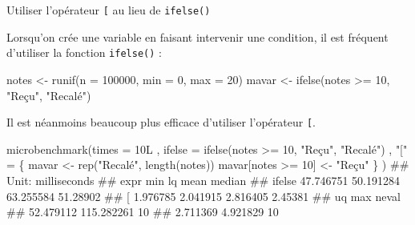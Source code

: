 \documentclass[12pt,ignorenonframetext,]{beamer}
\newenvironment{Shaded}{}{}
\newcommand{\DataTypeTok}[1]{#1}
\newcommand{\DecValTok}[1]{#1}
\newcommand{\KeywordTok}[1]{\textcolor[rgb]{0.00,0.00,1.00}{#1}}
\newcommand{\NormalTok}[1]{#1}
\newcommand{\OperatorTok}[1]{#1}
\newcommand{\StringTok}[1]{\textcolor[rgb]{0.00,0.50,0.50}{#1}}
\renewenvironment{Shaded}{\begin{snugshade}}{\end{snugshade}}
\begin{document}
\begin{frame}[fragile]{Utiliser l’opérateur \texttt{{[}} au lieu de
\texttt{ifelse()}}
\protect\hypertarget{utiliser-loperateur-au-lieu-de-ifelse}{}

\small

Lorsqu’on crée une variable en faisant intervenir une condition, il est
fréquent d’utiliser la fonction \texttt{ifelse()} :

\footnotesize

\begin{Shaded}
\begin{Highlighting}[]
\NormalTok{notes <-}\StringTok{ }\KeywordTok{runif}\NormalTok{(}\DataTypeTok{n =} \DecValTok{100000}\NormalTok{, }\DataTypeTok{min =} \DecValTok{0}\NormalTok{, }\DataTypeTok{max =} \DecValTok{20}\NormalTok{)}
\NormalTok{mavar <-}\StringTok{ }\KeywordTok{ifelse}\NormalTok{(notes }\OperatorTok{>=}\StringTok{ }\DecValTok{10}\NormalTok{, }\StringTok{"Reçu"}\NormalTok{, }\StringTok{"Recalé"}\NormalTok{)}
\end{Highlighting}
\end{Shaded}

\pause \small

Il est néanmoins beaucoup plus efficace d’utiliser l’opérateur
\texttt{{[}}.

\footnotesize

\begin{Shaded}
\begin{Highlighting}[]
\KeywordTok{microbenchmark}\NormalTok{(}\DataTypeTok{times =}\NormalTok{ 10L}
\NormalTok{  , }\DataTypeTok{ifelse =} \KeywordTok{ifelse}\NormalTok{(notes }\OperatorTok{>=}\StringTok{ }\DecValTok{10}\NormalTok{, }\StringTok{"Reçu"}\NormalTok{, }\StringTok{"Recalé"}\NormalTok{)}
\NormalTok{  , }\StringTok{"["}\NormalTok{ =}\StringTok{ }\NormalTok{\{}
\NormalTok{    mavar <-}\StringTok{ }\KeywordTok{rep}\NormalTok{(}\StringTok{"Recalé"}\NormalTok{, }\KeywordTok{length}\NormalTok{(notes))}
\NormalTok{    mavar[notes }\OperatorTok{>=}\StringTok{ }\DecValTok{10}\NormalTok{] <-}\StringTok{ "Reçu"}
\NormalTok{  \} }
\NormalTok{)}
\NormalTok{  ## Unit: milliseconds}
\NormalTok{  ##    expr       min        lq      mean   median}
\NormalTok{  ##  ifelse 47.746751 50.191284 63.255584 51.28902}
\NormalTok{  ##       [  1.976785  2.041915  2.816405  2.45381}
\NormalTok{  ##         uq        max neval}
\NormalTok{  ##  52.479112 115.282261    10}
\NormalTok{  ##   2.711369   4.921829    10}
\end{Highlighting}
\end{Shaded}

\end{frame}
\end{document}
